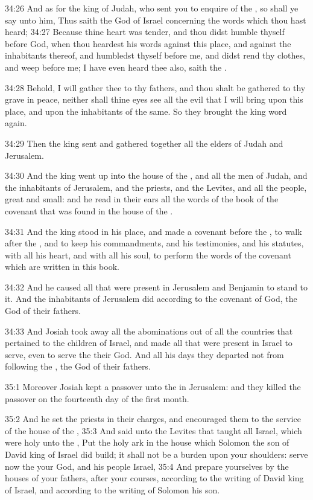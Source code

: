 34:26 And as for the king of Judah, who sent you to enquire of the \LORD, so shall ye say unto him, Thus saith the \LORD God of Israel concerning the words which thou hast heard; 34:27 Because thine heart was tender, and thou didst humble thyself before God, when thou heardest his words against this place, and against the inhabitants thereof, and humbledst thyself before me, and didst rend thy clothes, and weep before me; I have even heard thee also, saith the \LORD.

34:28 Behold, I will gather thee to thy fathers, and thou shalt be gathered to thy grave in peace, neither shall thine eyes see all the evil that I will bring upon this place, and upon the inhabitants of the same. So they brought the king word again.

34:29 Then the king sent and gathered together all the elders of Judah and Jerusalem.

34:30 And the king went up into the house of the \LORD, and all the men of Judah, and the inhabitants of Jerusalem, and the priests, and the Levites, and all the people, great and small: and he read in their ears all the words of the book of the covenant that was found in the house of the \LORD.

34:31 And the king stood in his place, and made a covenant before the \LORD, to walk after the \LORD, and to keep his commandments, and his testimonies, and his statutes, with all his heart, and with all his soul, to perform the words of the covenant which are written in this book.

34:32 And he caused all that were present in Jerusalem and Benjamin to stand to it. And the inhabitants of Jerusalem did according to the covenant of God, the God of their fathers.

34:33 And Josiah took away all the abominations out of all the countries that pertained to the children of Israel, and made all that were present in Israel to serve, even to serve the \LORD their God. And all his days they departed not from following the \LORD, the God of their fathers.

35:1 Moreover Josiah kept a passover unto the \LORD in Jerusalem: and they killed the passover on the fourteenth day of the first month.

35:2 And he set the priests in their charges, and encouraged them to the service of the house of the \LORD, 35:3 And said unto the Levites that taught all Israel, which were holy unto the \LORD, Put the holy ark in the house which Solomon the son of David king of Israel did build; it shall not be a burden upon your shoulders: serve now the \LORD your God, and his people Israel, 35:4 And prepare yourselves by the houses of your fathers, after your courses, according to the writing of David king of Israel, and according to the writing of Solomon his son.

